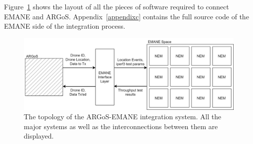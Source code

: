 Figure~\ref{emane_argos} shows the layout of all the pieces of software required to connect EMANE and ARGoS.
Appendix~\ref{appendixc} contains the full source code of the EMANE side of the integration process.
\begin{figure}[!ht]
    \centering
    \includegraphics[width=\textwidth,keepaspectratio]{Images/Chpt5/ARGoS-EMANE.png}
    \caption{The topology of the ARGoS-EMANE integration system. All the major systems as well as the interconnections between them are displayed.}
    \label{emane_argos}
\end{figure}

